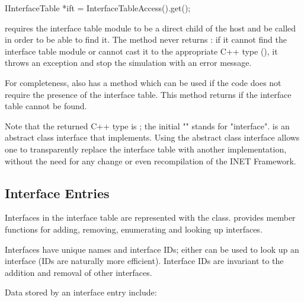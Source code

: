 \begin{cpp}
IInterfaceTable *ift = InterfaceTableAccess().get();
\end{cpp}

 requires the interface table module to be a
direct child of the host and be called  in order to
be able to find it. The  method never returns : if
it cannot find the interface table module or cannot cast it to the
appropriate C++ type (), it throws an exception
and stop the simulation with an error message.

For completeness,  also has a
 method which can be used if the code does not require
the presence of the interface table. This method returns  if the
interface table cannot be found.

Note that the returned C++ type is ; the initial
"" stands for "interface".  is an abstract
class interface that  implements. Using the abstract
class interface allows one to transparently replace the interface table with
another implementation, without the need for any change or even
recompilation of the INET Framework.
\fi

\subsection{Interface Entries}

Interfaces in the interface table are represented with the
 class.  provides member
functions for adding, removing, enumerating and looking up interfaces.

Interfaces have unique names and interface IDs; either can be used to look up
an interface (IDs are naturally more efficient). Interface IDs are invariant to
the addition and removal of other interfaces.

Data stored by an interface entry include:


